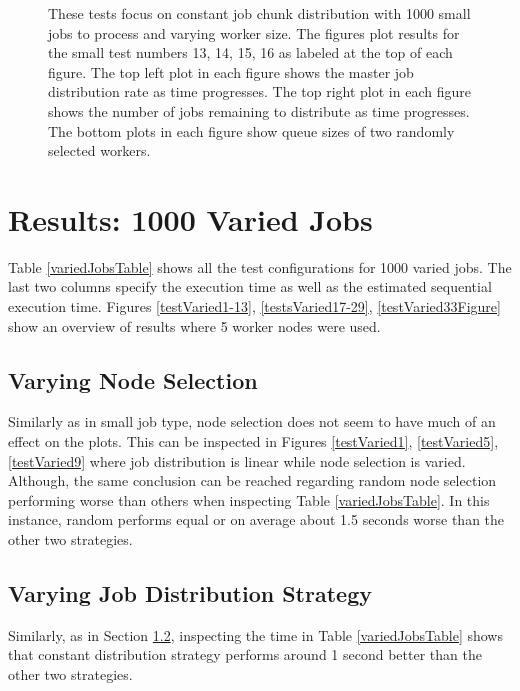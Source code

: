 \documentclass{article}
\begin{document}
\begin{figure}[p]
  
  \caption{These tests focus on constant job chunk distribution with 1000 small jobs to process and varying worker size. The figures plot results for the small test numbers 13, 14, 15, 16 as labeled at the top of each figure. The top left plot in each figure shows the master job distribution rate as time progresses. The top right plot in each figure shows the number of jobs remaining to distribute as time progresses. The bottom plots in each figure show queue sizes of two randomly selected workers.}
  \label{testsSmallConstant} 
  
\end{figure}

\newpage

\section{Results: 1000 Varied Jobs} \label{1000VariedJobs}
Table \ref{variedJobsTable} shows all the test configurations for 1000 varied jobs. The last two columns specify the execution time as well as the estimated sequential execution time. Figures \ref{testVaried1-13}, \ref{testsVaried17-29}, \ref{testVaried33Figure} show an overview of results where 5 worker nodes were used.

\subsection{Varying Node Selection} \label{variedNodeSelection}
Similarly as in small job type, node selection does not seem to have much of an effect on the plots. This can be inspected in Figures \ref{testVaried1}, \ref{testVaried5}, \ref{testVaried9} where job distribution is linear while node selection is varied. Although, the same conclusion can be reached regarding random node selection performing worse than others when inspecting Table \ref{variedJobsTable}. In this instance, random performs equal or on average about 1.5 seconds worse than the other two strategies.

\subsection{Varying Job Distribution Strategy} \label{variedJobDistribution}
Similarly, as in Section \ref{variedJobDistribution}, inspecting the time in Table \ref{variedJobsTable} shows that constant distribution strategy performs around 1 second better than the other two strategies.
\end{document}
